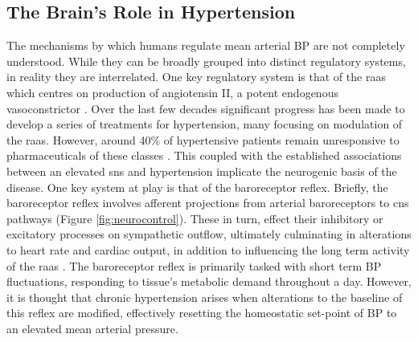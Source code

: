 \subsection{The Brain's Role in Hypertension} \label{brainhypertension}

The mechanisms by which humans regulate mean arterial BP are not completely understood. While they can be broadly grouped into distinct regulatory systems, in reality they are interrelated. One key regulatory system is that of the \acrfull{raas} which centres on production of angiotensin II, a potent endogenous vasoconstrictor \cite{Arumugam2016}. Over the last few decades significant progress has been made to develop a series of treatments for hypertension, many focusing on modulation of the \acrshort{raas}. However, around 40\% of hypertensive patients remain unresponsive to pharmaceuticals of these classes \cite{Primatesta2001}. This coupled with the established associations between an elevated \acrfull{sns} and hypertension implicate the neurogenic basis of the disease. One key system at play is that of the baroreceptor reflex. Briefly, the baroreceptor reflex involves afferent projections from arterial baroreceptors to \acrfull{cns} pathways (Figure \ref{fig:neurocontrol}). These in turn, effect their inhibitory or excitatory processes on sympathetic outflow, ultimately culminating in alterations to heart rate and cardiac output, in addition to influencing the long term activity of the \acrshort{raas} \cite{Mann2003}. The baroreceptor reflex is primarily tasked with short term BP fluctuations, responding to tissue’s metabolic demand throughout a day. However, it is thought that chronic hypertension arises when alterations to the baseline of this reflex are modified, effectively resetting the homeostatic set-point of BP to an elevated mean arterial pressure.


